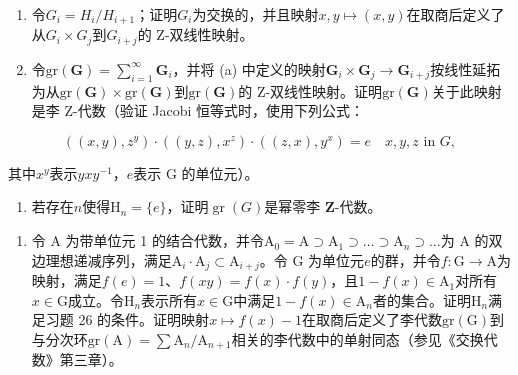 \begin{enumerate}
\def\labelenumi{(\alph{enumi})}
\item
  令\(G_{i} = H_{i}/H_{i+1}\)；证明\(G_{i}\)为交换的，并且映射\(x, y \mapsto (x, y)\)在取商后定义了从\(G_{i} \times G_{j}\)到\(G_{i+j}\)的 Z-双线性映射。
\item
  令\(\mathrm{gr}(\mathbf{G}) = \sum_{i=1}^{\infty} \mathbf{G}_i\)，并将 (a) 中定义的映射\(\mathbf{G}_i \times \mathbf{G}_j \to \mathbf{G}_{i+j}\)按线性延拓为从\(\mathrm{gr}(\mathbf{G}) \times \mathrm{gr}(\mathbf{G})\)到\(\mathrm{gr}(\mathbf{G})\)的 Z-双线性映射。证明\(\mathrm{gr}(\mathbf{G})\)关于此映射是李 Z-代数（验证 Jacobi 恒等式时，使用下列公式：
\end{enumerate}

\[
((x, y), z ^ {y}) \cdot ((y, z), x ^ {z}) \cdot ((z, x), y ^ {x}) = e \quad x, y, z \text {   in   } G,
\]

其中\(x^{y}\)表示\(yxy^{-1}\)，\(e\)表示 G 的单位元）。

\begin{enumerate}
\def\labelenumi{(\alph{enumi})}
\setcounter{enumi}{2}
\tightlist
\item
  若存在\(n\)使得\(\mathrm{H}_n = \{e\}\)，证明\(\operatorname{gr}(G)\)是幂零李 \(\mathbf{Z}\)-代数。
\end{enumerate}

\begin{enumerate}
\def\labelenumi{\arabic{enumi}.}
\setcounter{enumi}{26}
\tightlist
\item
   令 A 为带单位元 1 的结合代数，并令\(\mathrm{A}_0 = \mathrm{A} \supset \mathrm{A}_1 \supset \dots \supset \mathrm{A}_n \supset \dots\)为 A 的双边理想递减序列，满足\(\mathrm{A}_i \cdot \mathrm{A}_j \subset \mathrm{A}_{i+j}\)。令 G 为单位元\(e\)的群，并令\(f: \mathrm{G} \to \mathrm{A}\)为映射，满足\(f(e) = 1\)、\(f(xy) = f(x) \cdot f(y)\)，且\(1 - f(x) \in \mathrm{A}_1\)对所有\(x \in \mathrm{G}\)成立。令\(\mathrm{H}_n\)表示所有\(x \in \mathrm{G}\)中满足\(1 - f(x) \in \mathrm{A}_n\)者的集合。证明\(\mathrm{H}_n\)满足习题 26 的条件。证明映射\(x \mapsto f(x) - 1\)在取商后定义了李代数\(\mathrm{gr}(\mathrm{G})\)到与分次环\(\mathrm{gr}(\mathrm{A}) = \sum \mathrm{A}_n / \mathrm{A}_{n+1}\)相关的李代数中的单射同态（参见《交换代数》第三章）。
\end{enumerate}

\relax{}
